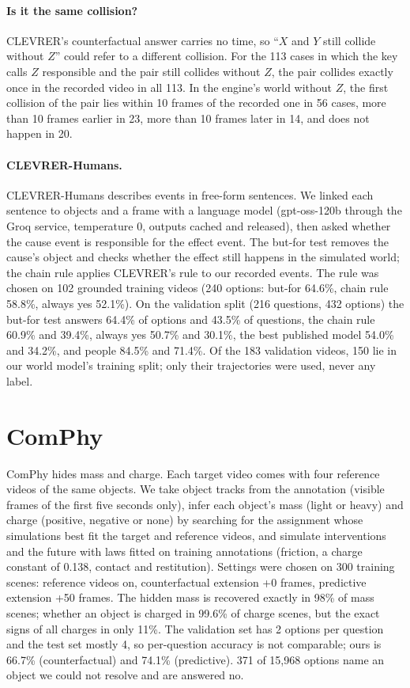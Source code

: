 \documentclass[10pt,onecolumn,letterpaper]{article}
\begin{document}
\paragraph{Is it the same collision?}
CLEVRER's counterfactual answer carries no time, so ``$X$ and $Y$ still collide without $Z$'' could refer to a different collision.
For the 113 cases in which the key calls $Z$ responsible and the pair still collides without $Z$, the pair collides exactly once in the recorded video in all 113.
In the engine's world without $Z$, the first collision of the pair lies within 10 frames of the recorded one in 56 cases, more than 10 frames earlier in 23, more than 10 frames later in 14, and does not happen in 20.

\paragraph{CLEVRER-Humans.}
CLEVRER-Humans describes events in free-form sentences.
We linked each sentence to objects and a frame with a language model (gpt-oss-120b through the Groq service, temperature 0, outputs cached and released), then asked whether the cause event is responsible for the effect event.
The but-for test removes the cause's object and checks whether the effect still happens in the simulated world; the chain rule applies CLEVRER's rule to our recorded events.
The rule was chosen on 102 grounded training videos (240 options: but-for 64.6\%, chain rule 58.8\%, always yes 52.1\%).
On the validation split (216 questions, 432 options) the but-for test answers 64.4\% of options and 43.5\% of questions, the chain rule 60.9\% and 39.4\%, always yes 50.7\% and 30.1\%, the best published model 54.0\% and 34.2\%, and people 84.5\% and 71.4\%.
Of the 183 validation videos, 150 lie in our world model's training split; only their trajectories were used, never any label.

\section{ComPhy}
\label{app:comphy}

ComPhy hides mass and charge. Each target video comes with four reference videos of the same objects.
We take object tracks from the annotation (visible frames of the first five seconds only), infer each object's mass (light or heavy) and charge (positive, negative or none) by searching for the assignment whose simulations best fit the target and reference videos, and simulate interventions and the future with laws fitted on training annotations (friction, a charge constant of 0.138, contact and restitution).
Settings were chosen on 300 training scenes: reference videos on, counterfactual extension +0 frames, predictive extension +50 frames.
The hidden mass is recovered exactly in 98\% of mass scenes; whether an object is charged in 99.6\% of charge scenes, but the exact signs of all charges in only 11\%.
The validation set has 2 options per question and the test set mostly 4, so per-question accuracy is not comparable; ours is 66.7\% (counterfactual) and 74.1\% (predictive).
371 of 15,968 options name an object we could not resolve and are answered no.
\end{document}
